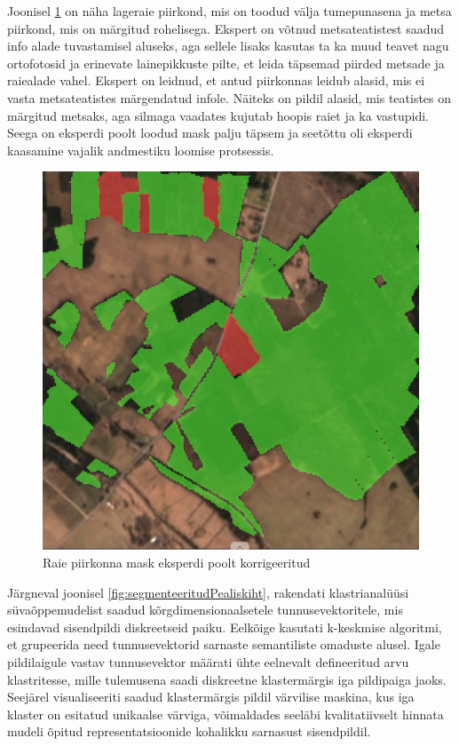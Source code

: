 Joonisel \ref{fig:raieInfoMask_ekspert} on näha lageraie piirkond, mis on toodud välja tumepunasena ja metsa piirkond, mis on märgitud rohelisega. Ekspert on võtnud metsateatistest saadud info alade tuvastamisel aluseks, aga sellele lisaks kasutas ta ka muud teavet nagu ortofotosid ja erinevate lainepikkuste pilte, et leida täpsemad piirded metsade ja raiealade vahel. Ekspert on leidnud, et antud piirkonnas leidub alasid, mis ei vasta metsateatistes märgendatud infole. Näiteks on pildil alasid, mis teatistes on märgitud metsaks, aga silmaga vaadates kujutab hoopis raiet ja ka vastupidi. Seega on eksperdi poolt loodud mask palju täpsem ja seetõttu oli eksperdi kaasamine vajalik andmestiku loomise protsessis.

\begin{figure}[H]
    \centering
    \includegraphics[width=.7\textwidth]{figures/seose_leidmine/raieInfoMask_ekspert.png}
    \caption{Raie piirkonna mask eksperdi poolt korrigeeritud}
    \label{fig:raieInfoMask_ekspert}
\end{figure}

Järgneval joonisel \ref{fig:segmenteeritudPealiskiht}, rakendati klastrianalüüsi süvaõppemudelist saadud
kõrgdimensionaalsetele tunnusevektoritele, mis esindavad sisendpildi
diskreetseid paiku. Eelkõige kasutati k-keskmise algoritmi, et grupeerida need
tunnusevektorid sarnaste semantiliste omaduste alusel. Igale pildilaigule vastav
tunnusevektor määrati ühte eelnevalt defineeritud arvu klastritesse, mille
tulemusena saadi diskreetne klastermärgis iga pildipaiga jaoks. Seejärel
visualiseeriti saadud klastermärgis pildil värvilise maskina, kus iga klaster on
esitatud unikaalse värviga, võimaldades seeläbi kvalitatiivselt hinnata mudeli
õpitud representatsioonide kohalikku sarnasust sisendpildil.

